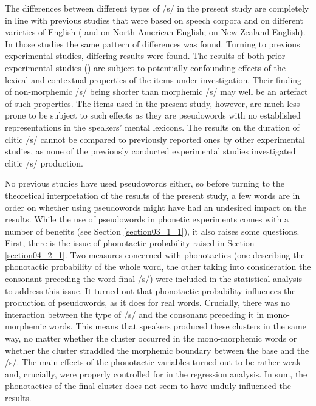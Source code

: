 The differences between different types of /s/ in the present study are completely in line with previous studies that were based on speech corpora and on different varieties of English (\cite{Plag2017} and \cite{Tomaschek2019} on North American English; \cite{Zimmermann2016} on New Zealand English). In those studies the same pattern of differences was found. Turning to previous experimental studies, differing results were found. The results of both prior experimental studies (\cite{Walsh1983, Seyfarth2017}) are subject to potentially confounding effects of the lexical and contextual properties of the items under investigation. Their finding of non-morphemic /s/ being shorter than morphemic /s/ may well be an artefact of such properties. The items used in the present study, however, are much less prone to be subject to such effects as they are pseudowords with no established representations in the speakers’ mental lexicons. The results on the duration of clitic /s/ cannot be compared to previously reported ones by other experimental studies, as none of the previously conducted experimental studies investigated clitic /s/ production.

No previous studies have used pseudowords either, so before turning to the theoretical interpretation of the results of the present study, a few words are in order on whether using pseudowords might have had an undesired impact on the results. While the use of pseudowords in phonetic experiments comes with a number of benefits (see Section \ref{section03_1_1}), it also raises some questions. First, there is the issue of phonotactic probability raised in Section \ref{section04_2_1}. Two measures concerned with phonotactics (one describing the phonotactic probability of the whole word, the other taking into consideration the consonant preceding the word-final /s/) were included in the statistical analysis to address this issue. It turned out that phonotactic probability influences the production of pseudowords, as it does for real words. Crucially, there was no interaction between the type of /s/ and the consonant preceding it in mono-morphemic words. This means that speakers produced these clusters in the same way, no matter whether the cluster occurred in the mono-morphemic words or whether the cluster straddled the morphemic boundary between the base and the /s/. The main effects of the phonotactic variables turned out to be rather weak and, crucially, were properly controlled for in the regression analysis. In sum, the phonotactics of the final cluster does not seem to have unduly influenced the results.

